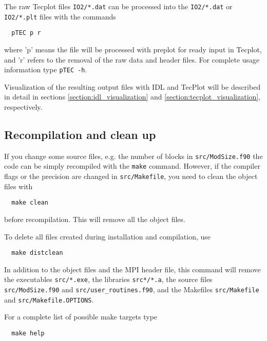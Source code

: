The raw Tecplot files {\tt IO2/*.dat} can be processed
into the {\tt IO2/*.dat} or {\tt IO2/*.plt} files
with the commands
\begin{verbatim}
  pTEC p r
\end{verbatim}
where 'p' means the file will be processed with preplot for ready input
in Tecplot, and 'r' refers to the removal of the raw data and header
files.  For complete usage information type {\tt pTEC -h}.

Visualization of the resulting output files with IDL and TecPlot
will be described in detail in sections \ref{section:idl_visualization}
and \ref{section:tecplot_visualization}, respectively.

\subsection{Recompilation and clean up}

If you change some source files, e.g. the number of blocks
in {\tt src/ModSize.f90} the code can be simply recompiled
with the {\tt make} command. However, if the compiler flags or the
precision are changed in {\tt src/Makefile}, you need to clean the
object files with
\begin{verbatim}
  make clean
\end{verbatim}
before recompilation. This will remove all the object files.

To delete all files created during installation and compilation, use
\begin{verbatim}
  make distclean
\end{verbatim}
In addition to the object files and the MPI header file, 
this command will remove the executables {\tt src/*.exe}, 
the libraries {\tt src*/*.a}, the source files
{\tt src/ModSize.f90} and {\tt src/user\_routines.f90}, 
and the Makefiles {\tt src/Makefile} and {\tt src/Makefile.OPTIONS}.

For a complete list of possible make targets type
\begin{verbatim}
  make help
\end{verbatim}
